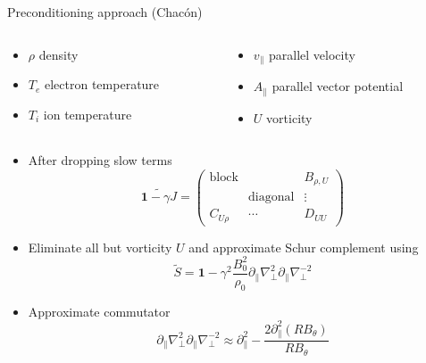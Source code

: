 \documentclass{beamer}
\begin{document}
\begin{frame}{Preconditioning approach (Chac\'on)}
  \begin{columns}
    \begin{column}{0.5\textwidth}
      \begin{itemize}
      \item $\rho$ density
      \item $T_e$ electron temperature
      \item $T_i$ ion temperature
      \end{itemize}       
    \end{column}
    \begin{column}{0.5\textwidth}
      \begin{itemize}
      \item $v_\parallel$  parallel velocity
      \item $A_\parallel$ parallel vector potential
      \item $U$ vorticity
      \end{itemize}
    \end{column}
  \end{columns}
  \begin{itemize}
  \item After dropping slow terms
    \begin{equation}
      \widetilde{\bm 1 - \gamma J} = \begin{pmatrix} \text{block} &  & B_{\rho,U} \\
          & \text{diagonal} & \vdots \\
         C_{U\rho} & \dotsb & D_{UU}
       \end{pmatrix}
    \end{equation}
  \item Eliminate all but vorticity $U$ and approximate Schur complement using
    \begin{equation*}
      \tilde S = \bm 1 - \gamma^2 \frac{B_0^2}{\rho_0} \partial_\parallel \nabla_\perp^2 \partial_\parallel \nabla_\perp^{-2}
    \end{equation*}
  \item Approximate commutator
    \begin{equation*}
      \partial_\parallel \nabla_\perp^2 \partial_\parallel \nabla_\perp^{-2} \approx \partial_\parallel^2 - \frac{2 \partial_\parallel^2 (RB_\theta)}{RB_\theta}
    \end{equation*}
  \end{itemize}
\end{frame}
\end{document}
